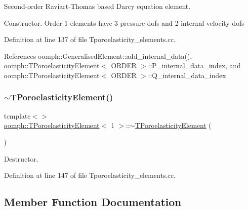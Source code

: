 Second-\/order Raviart-\/\+Thomas based Darcy equation element. 

Constructor. Order 1 elements have 3 pressure dofs and 2 internal velocity dofs 

Definition at line 137 of file Tporoelasticity\+\_\+elements.\+cc.



References oomph\+::\+Generalised\+Element\+::add\+\_\+internal\+\_\+data(), oomph\+::\+T\+Poroelasticity\+Element$<$ O\+R\+D\+E\+R $>$\+::\+P\+\_\+internal\+\_\+data\+\_\+index, and oomph\+::\+T\+Poroelasticity\+Element$<$ O\+R\+D\+E\+R $>$\+::\+Q\+\_\+internal\+\_\+data\+\_\+index.

\mbox{\label{classoomph_1_1TPoroelasticityElement_a8de01a7962eed4906d9d77399c6ccbdf}} 
\subsubsection{\texorpdfstring{$\sim$\+T\+Poroelasticity\+Element()}{~TPoroelasticityElement()}\hspace{0.1cm}{\footnotesize\ttfamily [3/3]}}
{\footnotesize\ttfamily template$<$$>$ \\
\hyperlink{classoomph_1_1TPoroelasticityElement}{oomph\+::\+T\+Poroelasticity\+Element}$<$ 1 $>$\+::$\sim$\hyperlink{classoomph_1_1TPoroelasticityElement}{T\+Poroelasticity\+Element} (\begin{DoxyParamCaption}{ }\end{DoxyParamCaption})}



Destructor. 



Definition at line 147 of file Tporoelasticity\+\_\+elements.\+cc.



\subsection{Member Function Documentation}
\mbox{\label{classoomph_1_1TPoroelasticityElement_a1c6d52613fdb0e2d56c49ef17f4774bc}} 

